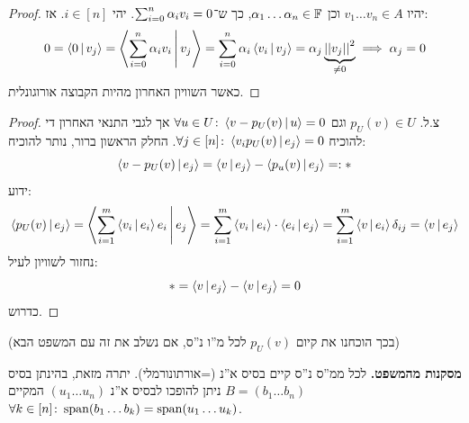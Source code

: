 \documentclass[]{../../../../tex/classes/styledArticle}
\begin{document}
    \begin{proof}
        יהיו $v_1 \dots v_n \in A$ וכן $\ag_1 \dots \ag_n \in \F$, כך ש־$\sumni \ag_i v_i = 0$. יהי $i \in [n]$. אז: 
        \[ 0 = \mut{0}{v_j} = \mut{\sumni \ag_i v_i}{v_j} = \sumni \ag_i \mut{v_i}{v_j} = \ag _j \underbrace{\norm{v_j}^2}_{\neq 0} \implies \ag_j = 0 \]
        כאשר השוויון האחרון מהיות הקבוצה אורוגונלית. 
    \end{proof}
    \begin{proof}
        צ.ל. $p_U(v) \in U$ וגם $\forall u \in U \co \mut{v - p_U(v)}{u} = 0$ אך לגבי התנאי האחרון די להוכיח $\forall j \in [n] \co \mut{v_i p_U(v)}{e_j}  = 0$. החלק הראשון ברור, נותר להוכיח: 
        \[ \mut{v - p_U(v)}{e_j} = \mut{v}{e_j} - \mut{p_u(v)}{e_j} =: * \]
        ידוע: 
        \[ \mut{p_U(v)}{e_j} = \mut{\sum_{i = 1}^{m}\mut{v_i}{e_i} e_i}{e_j} = \sum_{i = 1}^{m}\mut{v_i}{e_i} \cdot \mut{e_i}{e_j} = \sum_{i = 1}^{m}\mut{v}{e_i}\delta_{ij} = \mut{v}{e_j} \]
        נחזור לשוויון לעיל: 
        \[ *= \mut{v}{e_j} - \mut{v}{e_j} = 0 \]
        כדרוש. 
    \end{proof}
    (בכך הוכחנו את קיום $p_U(v)$ לכל מ''ו נ''ס, אם נשלב את זה עם המשפט הבא)
    
    \textbf{מסקנות מהמשפט. }לכל ממ''ס נ''ס קיים בסיס א''נ (=אורתונורמלי). יתרה מזאת, בהינתן בסיס $B = (b_1 \dots b_n)$ ניתן להופכו לבסיס א''נ $(u_1 \dots u_n)$ המקיים $\forall k \in [n] \co \Sp (b_1 \dots b_k) = \Sp(u_1 \dots u_k)$. 
    
\end{document}
